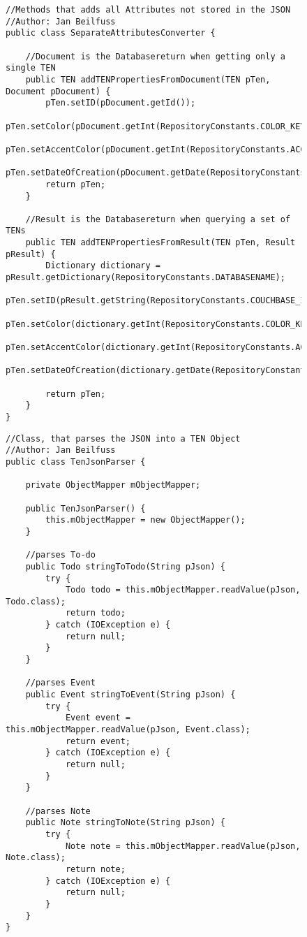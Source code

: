 \begin{figure}[H]
\begin{lstlisting}[caption=SeparateAttributesConverter (Jan Beilfuß)]
//Methods that adds all Attributes not stored in the JSON
//Author: Jan Beilfuss
public class SeparateAttributesConverter {

    //Document is the Databasereturn when getting only a single TEN
    public TEN addTENPropertiesFromDocument(TEN pTen, Document pDocument) {
        pTen.setID(pDocument.getId());
        pTen.setColor(pDocument.getInt(RepositoryConstants.COLOR_KEY));
        pTen.setAccentColor(pDocument.getInt(RepositoryConstants.ACCENT_COLOR_KEY));
        pTen.setDateOfCreation(pDocument.getDate(RepositoryConstants.CREATION_DATE_KEY));
        return pTen;
    }

    //Result is the Databasereturn when querying a set of TENs
    public TEN addTENPropertiesFromResult(TEN pTen, Result pResult) {
        Dictionary dictionary = pResult.getDictionary(RepositoryConstants.DATABASENAME);
        pTen.setID(pResult.getString(RepositoryConstants.COUCHBASE_ID_KEY));
        pTen.setColor(dictionary.getInt(RepositoryConstants.COLOR_KEY));
        pTen.setAccentColor(dictionary.getInt(RepositoryConstants.ACCENT_COLOR_KEY));
        pTen.setDateOfCreation(dictionary.getDate(RepositoryConstants.CREATION_DATE_KEY));

        return pTen;
    }
}
\end{lstlisting}
\end{figure}

\begin{figure}[H]
\begin{lstlisting}[caption=TensJsonParser (Jan Beilfuß)]
//Class, that parses the JSON into a TEN Object
//Author: Jan Beilfuss
public class TenJsonParser {

    private ObjectMapper mObjectMapper;

    public TenJsonParser() {
        this.mObjectMapper = new ObjectMapper();
    }

    //parses To-do
    public Todo stringToTodo(String pJson) {
        try {
            Todo todo = this.mObjectMapper.readValue(pJson, Todo.class);
            return todo;
        } catch (IOException e) {
            return null;
        }
    }

    //parses Event
    public Event stringToEvent(String pJson) {
        try {
            Event event = this.mObjectMapper.readValue(pJson, Event.class);
            return event;
        } catch (IOException e) {
            return null;
        }
    }

    //parses Note
    public Note stringToNote(String pJson) {
        try {
            Note note = this.mObjectMapper.readValue(pJson, Note.class);
            return note;
        } catch (IOException e) {
            return null;
        }
    }
}
\end{lstlisting}
\end{figure}
